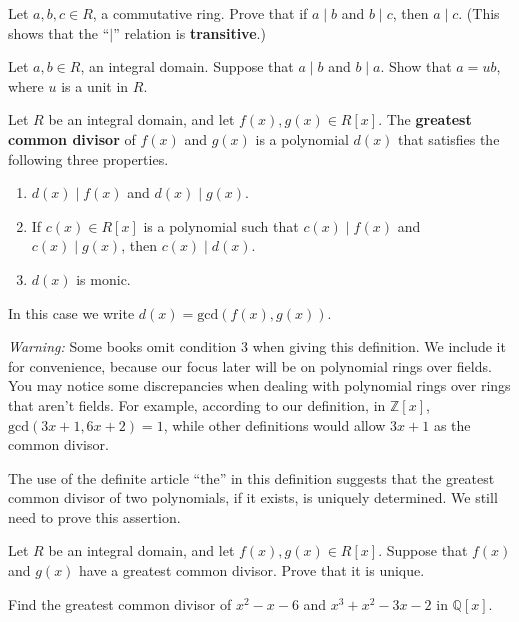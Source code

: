\begin{problem}
Let \(a,b,c\in R\), a commutative ring. Prove that if \(a\mid b\) and \(b\mid c\), then \(a \mid c\). (This shows that the ``\(\mid\)'' relation is \textbf{transitive}.)
\end{problem}

\begin{problem}
Let \(a,b\in R\), an integral domain. Suppose that \(a \mid b\) and \(b \mid a\). Show that \(a = ub\), where \(u\) is a unit in \(R\).
\end{problem}

\begin{definition}
Let \(R\) be an integral domain, and let \(f(x),g(x)\in R[x]\). The \textbf{greatest common divisor} of \(f(x)\) and \(g(x)\) is a polynomial \(d(x)\) that satisfies the following three properties.
\begin{enumerate}
  \item \(d(x) \mid f(x)\) and \(d(x) \mid g(x)\).
  \item If \(c(x)\in R[x]\) is a polynomial such that \(c(x) \mid f(x)\) and \(c(x) \mid g(x)\), then \(c(x) \mid d(x)\).
  \item \(d(x)\) is monic.
\end{enumerate}
In this case we write \(d(x) = \mbox{gcd}(f(x),g(x))\).
\end{definition}

\emph{Warning:} Some books omit condition 3 when giving this definition. We include it for convenience, because our focus later will be on polynomial rings over fields. You may notice some discrepancies when dealing with polynomial rings over rings that aren't fields. For example, according to our definition, in \(\mathbb{Z}[x]\), \(\text{gcd}(3x+1, 6x+2) = 1\), while other definitions would allow \(3x+1\) as the common divisor.

The use of the definite article ``the'' in this definition suggests that the greatest common divisor of two polynomials, if it exists, is uniquely determined. We still need to prove this assertion.

\begin{problem}
Let \(R\) be an integral domain, and let \(f(x),g(x)\in R[x]\). Suppose that \(f(x)\) and \(g(x)\) have a greatest common divisor.  Prove that it is unique.
\end{problem}

\begin{problem}
Find the greatest common divisor of \(x^2-x-6\) and \(x^3+x^2-3x-2\) in \(\mathbb{Q}[x]\).
\end{problem}

